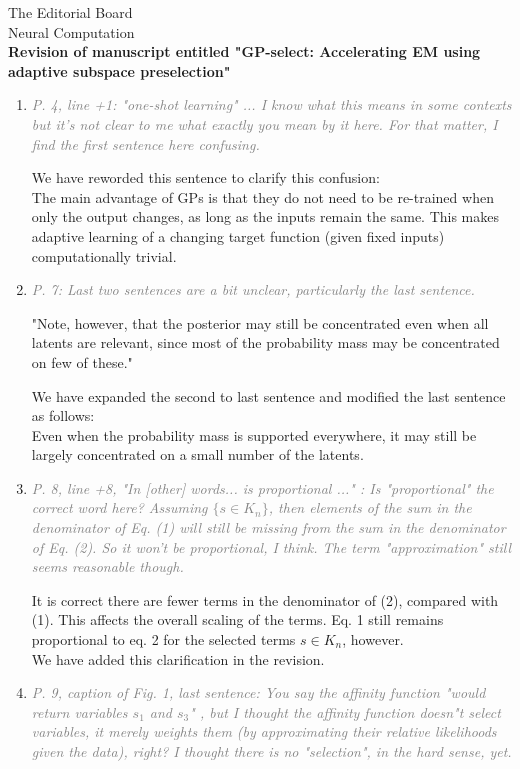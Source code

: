 \documentclass[10pt]{letter}
\newcommand{\rvr}[1]{\textcolor{gray}{#1}}
\begin{document}
\begin{letter}{
The Editorial Board\\
Neural Computation\\
\vspace{10mm}
\textbf{Revision of manuscript entitled "GP-select: Accelerating EM using adaptive
subspace preselection"}
}
\begin{enumerate}[topsep=3pt,itemsep=2ex,partopsep=1ex,parsep=1ex]
    \item \rvr{\emph{P. 4, line +1: "one-shot learning" ... I know what this means in some contexts but it's not clear to me what exactly you mean by it here. For that matter, I find the first sentence here confusing.}}

    We have reworded this sentence to clarify this confusion:\\
     The main advantage of GPs is that they do not need to be re-trained when only the output changes, as long as the inputs remain the same. This makes adaptive learning of a changing target function (given fixed inputs) computationally trivial.


    \item \rvr{\emph{P. 7: Last two sentences are a bit unclear, particularly the last sentence.}}

"Note, however, that the posterior may still be concentrated even when all latents are relevant, since most of the probability mass may be concentrated on few of these."

We have expanded the second to last sentence and modified the last sentence as follows:\\
Even when the probability mass is supported everywhere, it may still be largely concentrated on a small number of the latents.

    \item \rvr{\emph{ P. 8, line +8,   "In [other] words... is proportional ..." : Is "proportional"  the correct word here? Assuming $\{ s \in K_n \}$, then elements of the sum in the denominator of Eq. (1) will still be missing from the sum in the denominator of Eq. (2). So it won't be proportional, I think. The term "approximation" still seems reasonable though.}}

It is correct there are fewer terms in the denominator of (2), compared with (1). This affects the overall scaling of the terms. Eq. 1 still remains proportional to eq. 2 for the selected terms $s\in K_n$, however. \\
We have added this clarification in the revision.

    \item \rvr{\emph{P. 9, caption of Fig. 1, last sentence: You say the affinity function "would return variables $s_1$ and $s_3$" , but I thought the affinity function doesn"t select variables, it merely weights them (by approximating their relative likelihoods given the data), right? I thought there is no "selection", in the hard sense, yet.}}


\end{enumerate}
\end{letter}
\end{document}
